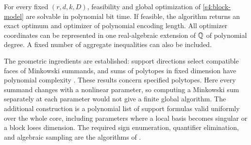 \begin{theorem}
\label{s4:fixed-core}
For every fixed $(r,d,k,D)$, feasibility and global optimization of
\eqref{s4:block-model} are solvable in polynomial bit time. If feasible,
the algorithm returns an exact optimum and optimizer of polynomial
encoding length. All optimizer coordinates can be represented in one
real-algebraic extension of $\mathbb Q$ of polynomial degree. A fixed number
of aggregate inequalities can also be included.
\end{theorem}

The geometric ingredients are established: support directions select
compatible faces of Minkowski summands, and sums of polytopes in fixed
dimension have polynomial complexity
\citep{s4:gritzmann1993,s4:fukuda2004}. These results concern specified
polytopes. Here every summand changes with a nonlinear parameter, so
computing a Minkowski sum separately at each parameter would not give
a finite global algorithm. The additional construction is a polynomial
list of support formulas valid uniformly over the whole core, including
parameters where a local basis becomes singular or a block loses
dimension. The required sign enumeration, quantifier elimination, and
algebraic sampling are the algorithms of
\citet[Theorem~1.3.1 and Sections~3.1.3--3.2]
{basu1996-on-the-combinatorial-and-algebraic}.

